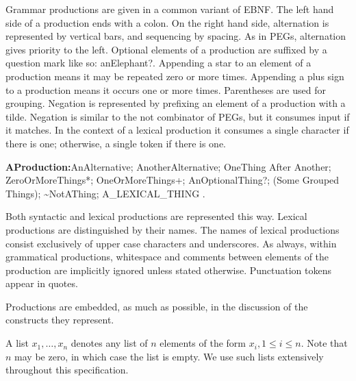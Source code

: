 \documentclass{article}
\newcommand{\code}[1]{{\sf #1}}
\begin{document}
\LMHash{}
Grammar productions are given in a common variant of EBNF.  The left hand side of a production ends with a colon.  On the right hand side, alternation is represented by vertical bars, and sequencing by spacing.  As in PEGs, alternation gives priority to the left. Optional elements of a production are suffixed by a question mark like so: \code{anElephant?}.  Appending a star to an element of a production means it may be repeated zero or more times.  Appending a plus sign to a production means it occurs one or more times. Parentheses are used for grouping. Negation  is represented by prefixing an element of a production with a tilde. Negation is similar to the not combinator of PEGs, but it consumes input if it matches. In the context of a lexical production it consumes a single character if there is one;  otherwise, a single token if there is one.


\begin{grammar}
{\sf
{\bf AProduction:}AnAlternative;
    AnotherAlternative;
    OneThing After Another;
    ZeroOrMoreThings*;
    OneOrMoreThings+;
    AnOptionalThing?;
    (Some Grouped Things);
    \~{}NotAThing;
    A\_LEXICAL\_THING
    .
    }
\end{grammar}


\LMHash{}
Both syntactic and lexical productions are represented this way. Lexical productions are distinguished by their names. The names of lexical productions consist exclusively of upper case characters and underscores.  As always, within grammatical productions, whitespace and comments between elements of the production are implicitly ignored unless stated otherwise.
Punctuation tokens appear in quotes.

\LMHash{}
Productions are embedded, as much as possible, in the discussion of the constructs they represent.

\LMHash{}
A list $x_1, \ldots, x_n$ denotes any list of $n$ elements of the form $x_i, 1 \le i \le n$. Note that $n$ may be zero, in which case the list is empty. We use such lists extensively throughout this specification.
\end{document}
